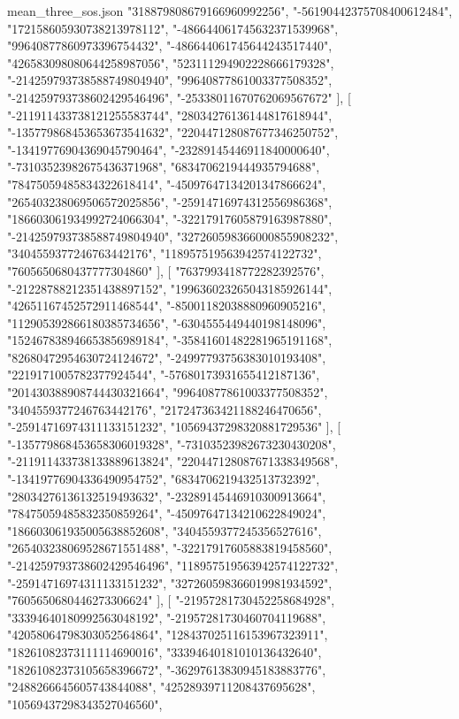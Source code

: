 \begin{filecontents*}[overwrite]{mean_three_sos.json}
    "318879808679166960992256",
    "-56190442375708400612484",
    "172158605930738213978112",
    "-486644061745632371539968",
    "99640877860973396754432",
    "-486644061745644243517440",
    "426583098080644258987056",
    "523111294902228666179328",
    "-214259793738588749804940",
    "99640877861003377508352",
    "-214259793738602429546496",
    "-25338011670762069567672"
   ],
   [
    "-211911433738121255583744",
    "28034276136144817618944",
    "-135779868453653673541632",
    "220447128087677346250752",
    "-13419776904369045790464",
    "-23289145446911840000640",
    "-73103523982675436371968",
    "6834706219444935794688",
    "78475059485834322618414",
    "-45097647134201347866624",
    "265403238069506572025856",
    "-25914716974312556986368",
    "186603061934992724066304",
    "-32217917605879163987880",
    "-214259793738588749804940",
    "327260598366000855908232",
    "3404559377246763442176",
    "118957519563942574122732",
    "7605650680437777304860"
   ],
   [
    "7637993418772282392576",
    "-21228788212351438897152",
    "199636023265043185926144",
    "42651167452572911468544",
    "-85001182038880960905216",
    "112905392866180385734656",
    "-6304555449440198148096",
    "152467838946653856989184",
    "-35841601482281965191168",
    "82680472954630724124672",
    "-24997793756383010193408",
    "2219171005782377924544",
    "-57680173931655412187136",
    "201430388908744430321664",
    "99640877861003377508352",
    "3404559377246763442176",
    "217247363421188246470656",
    "-25914716974311133151232",
    "10569437298320881729536"
   ],
   [
    "-135779868453658306019328",
    "-73103523982673230430208",
    "-211911433738133889613824",
    "220447128087671338349568",
    "-13419776904336490954752",
    "6834706219432513732392",
    "28034276136132519493632",
    "-23289145446910300913664",
    "78475059485832350859264",
    "-45097647134210622849024",
    "186603061935005638852608",
    "3404559377245356527616",
    "265403238069528671551488",
    "-32217917605883819458560",
    "-214259793738602429546496",
    "118957519563942574122732",
    "-25914716974311133151232",
    "327260598366019981934592",
    "7605650680446273306624"
   ],
   [
    "-21957281730452258684928",
    "33394640180992563048192",
    "-21957281730460704119688",
    "42058064798303052564864",
    "128437025116153967323911",
    "18261082373111114690016",
    "33394640181010136432640",
    "18261082373105658396672",
    "-36297613830945183883776",
    "2488266645605743844088",
    "42528939711208437695628",
    "10569437298343527046560",

\end{filecontents*}

